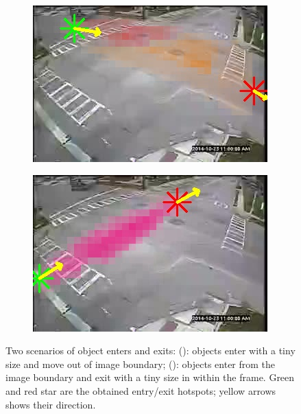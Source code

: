 \begin{figure}
\centering
    \begin{subfigure}{0.4\linewidth}
        \includegraphics[width=\linewidth]{./img/semantic_tracker/193402-entry-exit-0.jpg}
        \subcaption{}
        \label{subfig:semantic-extry-exit-eg1}
    \end{subfigure}
    \begin{subfigure}{0.4\linewidth}
        \includegraphics[width=\linewidth]{./img/semantic_tracker/193402-entry-exit-3.jpg}
        \subcaption{}
        \label{subfig:semantic-extry-exit-eg2}
    \end{subfigure}%
    \caption{Two scenarios of object enters and exits: (): objects enter with a tiny size and move out of image boundary; (): objects enter from the image boundary and exit with a tiny size in within the frame. Green and red star are the obtained entry/exit hotspots; yellow arrows shows their direction.}
    \label{fig:semantic-entry-exit}
\end{figure}